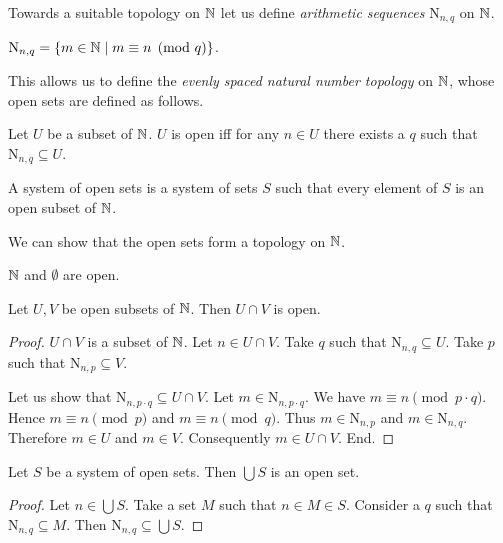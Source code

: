 \documentclass{article}
\newcommand{\N}{\mathrm{N}}
\begin{document}
  Towards a suitable topology on $\mathbb{N}$ let us define \textit{arithmetic
  sequences} $\N_{n, q}$ on $\mathbb{N}$.

  \begin{forthel}
    \begin{definition}
      $\N_{n, q} = \{ m \in \Nat \mid m \equiv n \pmod{q} \}$.
    \end{definition}
  \end{forthel}

  This allows us to define the \textit{evenly spaced natural number
  topology} on $\mathbb{N}$, whose open sets are defined as follows.

  \begin{forthel}
    \begin{definition}
      Let $U$ be a subset of $\mathbb{N}$.
      $U$ is open iff for any $n \in U$ there exists a $q$ such that
      $\N_{n, q} \subseteq U$.
    \end{definition}

    \begin{definition}
      A system of open sets is a system of sets $S$ such that every element of
      $S$ is an open subset of $\mathbb{N}$.
    \end{definition}
  \end{forthel}

  We can show that the open sets form a topology on $\mathbb{N}$.

  \begin{forthel}
    \begin{lemma}
      $\mathbb{N}$ and $\emptyset$ are open.
    \end{lemma}

    \begin{lemma}
      Let $U,V$ be open subsets of $\mathbb{N}$.
      Then $U \cap V$ is open.
    \end{lemma}
    \begin{proof}
      $U \cap V$ is a subset of $\mathbb{N}$.
      Let $n \in U \cap V$.
      Take $q$ such that $\N_{n, q} \subseteq U$.
      Take $p$ such that $\N_{n, p} \subseteq V$.

      Let us show that $\N_{n, p \cdot q} \subseteq U \cap V$.
        Let $m \in \N_{n, p \cdot q}$.
        We have $m \equiv n \pmod{p \cdot q}$.
        Hence $m \equiv n \pmod{p}$ and $m \equiv n \pmod{q}$.
        Thus $m \in \N_{n, p}$ and $m \in \N_{n, q}$.
        Therefore $m \in U$ and $m \in V$.
        Consequently $m \in U \cap V$.
      End.
    \end{proof}

    \begin{lemma}
      Let $S$ be a system of open sets.
      Then $\bigcup S$ is an open set.
    \end{lemma}
    \begin{proof}
      Let $n \in \bigcup S$.
      Take a set $M$ such that $n \in M \in S$.
      Consider a $q$ such that $\N_{n, q} \subseteq M$.
      Then $\N_{n, q} \subseteq \bigcup S$.
    \end{proof}
  \end{forthel}
\end{document}
